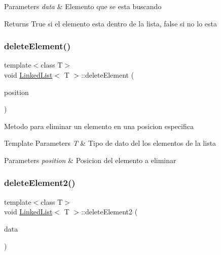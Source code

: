 \begin{DoxyParams}{Parameters}
{\em data} & Elemento que se esta buscando \\
\hline
\end{DoxyParams}
\begin{DoxyReturn}{Returns}
True si el elemento esta dentro de la lista, false si no lo esta 
\end{DoxyReturn}
\mbox{\label{classLinkedList_ac9ee137c10f202a1cdc2c9da0a685830}} 
\subsubsection{\texorpdfstring{delete\+Element()}{deleteElement()}}
{\footnotesize\ttfamily template$<$class T$>$ \\
void \hyperlink{classLinkedList}{Linked\+List}$<$ T $>$\+::delete\+Element (\begin{DoxyParamCaption}\item[{int}]{position }\end{DoxyParamCaption})\hspace{0.3cm}{\ttfamily [inline]}}

Metodo para eliminar un elemento en una posicion especifica 
\begin{DoxyTemplParams}{Template Parameters}
{\em T} & Tipo de dato del los elementos de la lista \\
\hline
\end{DoxyTemplParams}

\begin{DoxyParams}{Parameters}
{\em position} & Posicion del elemento a eliminar \\
\hline
\end{DoxyParams}
\mbox{\label{classLinkedList_ac19ed825dc7942471971cdb0d652fd31}} 
\subsubsection{\texorpdfstring{delete\+Element2()}{deleteElement2()}}
{\footnotesize\ttfamily template$<$class T$>$ \\
void \hyperlink{classLinkedList}{Linked\+List}$<$ T $>$\+::delete\+Element2 (\begin{DoxyParamCaption}\item[{T}]{data }\end{DoxyParamCaption})\hspace{0.3cm}{\ttfamily [inline]}}

